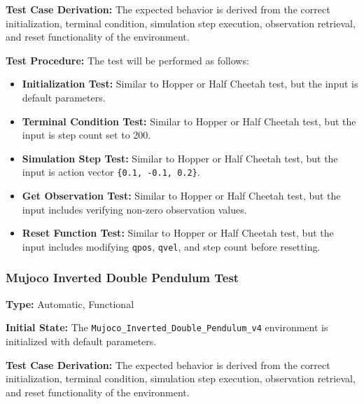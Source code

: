 \documentclass[12pt, titlepage]{article}
\begin{document}
\textbf{Test Case Derivation:} The expected behavior is derived from the correct initialization, terminal condition, simulation step execution, observation retrieval, and reset functionality of the environment.

\textbf{Test Procedure:} The test will be performed as follows:
\begin{itemize}
    \item \textbf{Initialization Test:} Similar to Hopper or Half Cheetah test, but the input is default parameters.
    
    \item \textbf{Terminal Condition Test:} Similar to Hopper or Half Cheetah test, but the input is step count set to 200.
    
    \item \textbf{Simulation Step Test:} Similar to Hopper or Half Cheetah test, but the input is action vector \texttt{\{0.1, -0.1, 0.2\}}.
    
    \item \textbf{Get Observation Test:} Similar to Hopper or Half Cheetah test, but the input includes verifying non-zero observation values.
    
    \item \textbf{Reset Function Test:} Similar to Hopper or Half Cheetah test, but the input includes modifying \texttt{qpos}, \texttt{qvel}, and step count before resetting.
\end{itemize}


\subsubsection{Mujoco Inverted Double Pendulum Test\\}

\textbf{Type:} Automatic, Functional

\textbf{Initial State:} The \texttt{Mujoco\_Inverted\_Double\_Pendulum\_v4} environment is initialized with default parameters.

\textbf{Test Case Derivation:} The expected behavior is derived from the correct initialization, terminal condition, simulation step execution, observation retrieval, and reset functionality of the environment.
\end{document}
